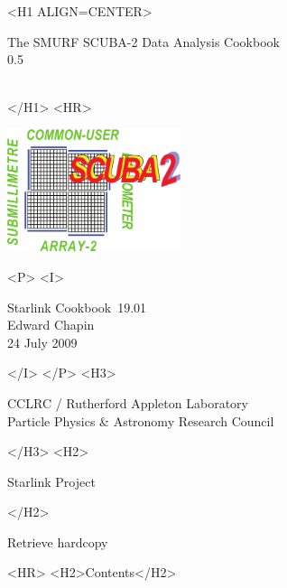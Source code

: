 \documentclass[twoside,11pt]{article}
\newcommand{\stardoccategory}  {Starlink Cookbook}
\newcommand{\stardocsource}    {sc\stardocnumber}
\newcommand{\stardocnumber}    {19.01}
\newcommand{\stardocauthors}   {Edward Chapin}
\newcommand{\stardocdate}      {24 July 2009}
\newcommand{\stardoctitle}     {The SMURF SCUBA-2 Data Analysis Cookbook}
\newcommand{\stardocversion}   {0.5}
\newcommand{\stardocmanual}    {\ }
\newcommand{\htmladdnormallink}[2]{#1}
\newcommand{\htmladdimg}[1]{}
\newcommand{\htmlref}[2]{#1}
\newcommand{\htmladdtonavigation}[1]{}
\newcommand{\xlabel}[1]{}
\renewcommand{\_}{\texttt{\symbol{95}}}
\begin{document}
\begin{htmlonly}
   \xlabel{}
   \begin{rawhtml} <H1 ALIGN=CENTER> \end{rawhtml}
      \stardoctitle\\
      \stardocversion\\
      \stardocmanual
   \begin{rawhtml} </H1> <HR> \end{rawhtml}

\includegraphics[width=2.0in]{sc19_logo}

   \begin{rawhtml} <P> <I> \end{rawhtml}
   \stardoccategory\ \stardocnumber \\
   \stardocauthors \\
   \stardocdate
   \begin{rawhtml} </I> </P> <H3> \end{rawhtml}
      \htmladdnormallink{CCLRC}{http://www.cclrc.ac.uk} /
      \htmladdnormallink{Rutherford Appleton Laboratory}
                        {http://www.cclrc.ac.uk/ral} \\
      \htmladdnormallink{Particle Physics \& Astronomy Research 
Council}
                        {http://www.pparc.ac.uk} \\
   \begin{rawhtml} </H3> <H2> \end{rawhtml}
      \htmladdnormallink{Starlink Project}{http://star-www.rl.ac.uk/}
   \begin{rawhtml} </H2> \end{rawhtml}
   \htmladdnormallink{\htmladdimg{source.gif} Retrieve hardcopy}
      {http://star-www.rl.ac.uk/cgi-bin/hcserver?\stardocsource}\\

  \label{stardoccontents}
  \begin{rawhtml} 
    <HR>
    <H2>Contents</H2>
  \end{rawhtml}
  \htmladdtonavigation{\htmlref{\htmladdimg{contents_motif.gif}}
        {stardoccontents}}


\end{htmlonly}
\end{document}
